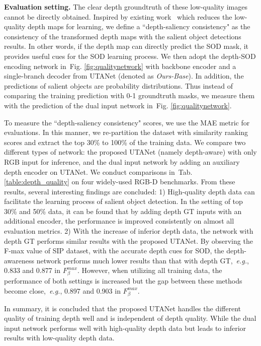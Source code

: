 \documentclass[journal]{IEEEtran}
\def\eg{{\em e.g.}}
\newcommand{\figref}[1]{Fig. \ref{#1}}
\newcommand{\tabref}[1]{Tab. \ref{#1}}
\begin{document}
\textbf{Evaluation setting.} The clear depth groundtruth of these low-quality images cannot be directly obtained. Inspired by existing work~\cite{fan2019D3Net} which reduces the low-quality depth maps for learning, we define a ``depth-saliency consistency" as the consistency of the transformed depth maps with the salient object detections results. In other words, if the depth map can directly predict the SOD mask, it provides useful cues for the SOD learning process. We then adopt the depth-SOD encoding network in~\figref{fig:qualitynetwork} with backbone encoder and a single-branch decoder from UTANet (denoted as \textit{Ours-Base}). In addition, the predictions of salient objects are probability distributions. Thus instead of comparing the training prediction with 0-1 groundtruth masks, we measure them with the prediction of the dual input network in~\figref{fig:qualitynetwork}.

To measure the ``depth-saliency consistency" scores, we use the MAE metric for evaluations.  In this manner, we re-partition the dataset with similarity ranking scores and extract the top 30\% to 100\% of the training data.  We compare two different types of network: the proposed UTANet (namely depth-aware) with only RGB input for inference, and the dual input network by adding an auxiliary depth encoder on UTANet.
We conduct comparisons in~\tabref{table:depth_quality} on four widely-used RGB-D benchmarks. From these results, several interesting findings are concluded:
1) High-quality depth data can facilitate the learning process of salient object detection. In the setting of top 30\% and 50\% data, it can be found that by adding depth GT inputs with an additional encoder, the performance is improved consistently on almost all evaluation metrics.
2) With the increase of inferior depth data, the network with depth GT performs similar results with the proposed UTANet. By observing the F-max value of SIP dataset, with the accurate depth cues for SOD, the depth-awareness network performs much lower results than that with depth GT,~\eg, 0.833 and 0.877 in $F_\beta^{max}$. However, when utilizing all training data, the performance of both settings is increased but the gap between these methods become close,~\eg, 0.897 and 0.903 in $F_\beta^{max}$.

In summary, it is concluded that the proposed UTANet handles the different quality of training depth well and is independent of depth quality. While the dual input network performs well with high-quality depth data but leads to inferior results with low-quality depth data.
\end{document}
